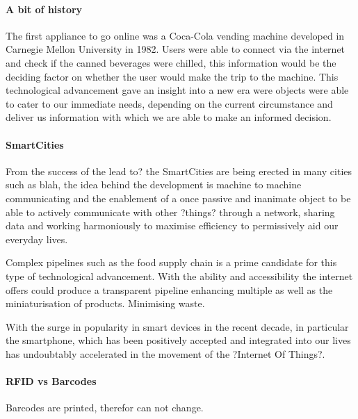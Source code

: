 \documentclass[a4paper, 11pt]{article}
\begin{document}
\paragraph{A bit of history} The first appliance to go online was a Coca-Cola vending machine developed in Carnegie Mellon University in 1982. Users were able to connect via the internet and check if the canned beverages were chilled, this information would be the deciding factor on whether the user would make the trip to the machine. This technological advancement gave an insight into a new era were objects were able to cater to our immediate needs, depending on the current circumstance and deliver us information with which we are able to make an informed decision.

\paragraph{SmartCities} From the success of the lead to?  the SmartCities are being erected in many cities such as blah, the idea behind the development is machine to machine communicating and the enablement of a once passive and inanimate object to be able to actively communicate with other ?things? through a network, sharing data and working harmoniously to maximise efficiency to permissively aid our everyday lives. 

Complex pipelines such as the food supply chain is a prime candidate for this type of technological advancement. With the ability and accessibility the internet offers could produce a transparent pipeline enhancing multiple as well as the miniaturisation of products. Minimising waste.

With the surge in popularity in smart devices in the recent decade, in particular the smartphone, which has been positively accepted and integrated into our lives has undoubtably accelerated in the movement of the ?Internet Of Things?. 

\paragraph{RFID vs Barcodes}
Barcodes are printed, therefor can not change.

\vspace{\baselineskip}
\vspace{\baselineskip}
\vspace{\baselineskip}
\end{document}
